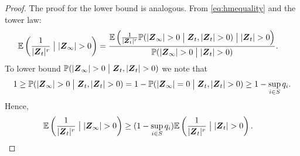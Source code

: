 \documentclass[preprint,3p,12pt]{elsarticle}
\theoremstyle{definition}
\begin{document}
\begin{proof}
    The proof for the lower bound is analogous. From \eqref{eq:hmequality} and the tower law:
  \begin{align*}
     \mathbb{E}\left(\frac{1}{|\boldsymbol{Z}_t|^{r}}\bigm| |\boldsymbol{Z}_{\infty}| >0 \right) %
        &= \frac{\mathbb{E}\left(\frac{1}{|\boldsymbol{Z}_t|^{r}}\mathbb{P}(|\boldsymbol{Z}_\infty| > 0\bigm| \boldsymbol{Z}_{t},|\boldsymbol{Z}_{t}| >0)\bigm| |\boldsymbol{Z}_{t}| >0 \right)}{\mathbb{P}( |\boldsymbol{Z}_{\infty}| >0\bigm| |\boldsymbol{Z}_{t}| >0 )}. \label{still_equal} 
        \end{align*}
  To lower bound $\mathbb{P}( |\boldsymbol{Z}_{\infty}| >0\bigm| \boldsymbol{Z}_t, |\boldsymbol{Z}_{t}| >0)$ we note that
        \begin{equation*}
            1 \ge \mathbb{P}( |\boldsymbol{Z}_{\infty}| >0\bigm| \boldsymbol{Z}_t,|\boldsymbol{Z}_t| > 0) = 1 - \mathbb{P}( |\boldsymbol{Z}_{\infty}| =0\bigm| \boldsymbol{Z}_t,|\boldsymbol{Z}_t| > 0) \ge 1-\sup_{i \in S}q_i.
        \end{equation*}
        Hence,
        \begin{align*}
     \mathbb{E}\left(\frac{1}{|\boldsymbol{Z}_t|^{r}}\bigm| |\boldsymbol{Z}_{\infty}| >0 \right) & \ge (1-\sup_{i \in S}q_i)\mathbb{E}\left(\frac{1}{|\boldsymbol{Z}_t|^{r}}\bigm| |\boldsymbol{Z}_{t}|>0\right).
\end{align*}

\end{proof}
\end{document}

